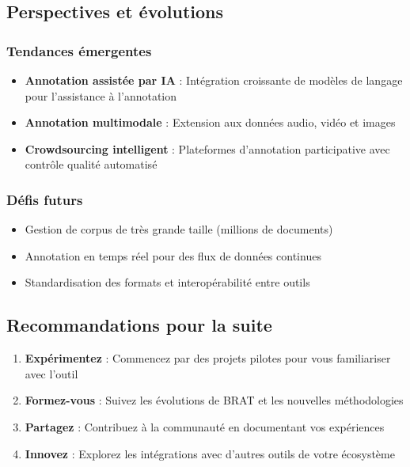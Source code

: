 \subsection{Perspectives et évolutions}

\subsubsection{Tendances émergentes}
\begin{itemize}
    \item \textbf{Annotation assistée par IA} : Intégration croissante de modèles de langage pour l'assistance à l'annotation
    \item \textbf{Annotation multimodale} : Extension aux données audio, vidéo et images
    \item \textbf{Crowdsourcing intelligent} : Plateformes d'annotation participative avec contrôle qualité automatisé
\end{itemize}

\subsubsection{Défis futurs}
\begin{itemize}
    \item Gestion de corpus de très grande taille (millions de documents)
    \item Annotation en temps réel pour des flux de données continues
    \item Standardisation des formats et interopérabilité entre outils
\end{itemize}

\subsection{Recommandations pour la suite}

\begin{enumerate}
    \item \textbf{Expérimentez} : Commencez par des projets pilotes pour vous familiariser avec l'outil
    \item \textbf{Formez-vous} : Suivez les évolutions de BRAT et les nouvelles méthodologies
    \item \textbf{Partagez} : Contribuez à la communauté en documentant vos expériences
    \item \textbf{Innovez} : Explorez les intégrations avec d'autres outils de votre écosystème
\end{enumerate}

